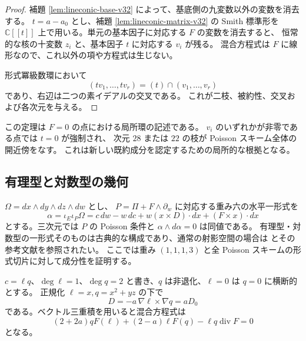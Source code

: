 \begin{proof}
補題 \ref{lem:lineconic-base-v32} によって、基底側の九変数以外の変数を消去する。
$t=a-a_0$ とし、補題 \ref{lem:lineconic-matrix-v32} の Smith 標準形を
$\mathbb C[[t]]$ 上で用いる。単元の基本因子に対応する $F$ の変数を消去すると、
恒常的な核の十変数 $z_i$ と、基本因子 $t$ に対応する $v_i$ が残る。
混合方程式は $F$ に線形なので、これ以外の項や方程式は生じない。

形式冪級数環において
\[
 (tv_1,\ldots,tv_r)=(t)\cap(v_1,\ldots,v_r)
\]
であり、右辺は二つの素イデアルの交叉である。
これが二枝、被約性、交叉および各次元を与える。
\end{proof}

この定理は $F=0$ の点における局所環の記述である。
$v_i$ のいずれかが非零である点では $t=0$ が強制され、
次元 $28$ または $22$ の枝が Poisson スキーム全体の開近傍をなす。
これは新しい既約成分を認定するための局所的な根拠となる。

\subsection{有理型と対数型の幾何}

$\Omega=dx\wedge dy\wedge dz\wedge dw$ とし、
$P=\Pi+F\wedge\partial_w$ に対応する重み六の水平一形式を
\[
 \alpha=\iota_E\iota_P\Omega
 =c\,dw-w\,dc+w(x\times D)\cdot dx+(F\times x)\cdot dx
\]
とする。三次元では $P$ の Poisson 条件と $\alpha\wedge d\alpha=0$ は同値である。
有理型・対数型の一形式そのものは古典的な構成であり、通常の射影空間の場合は
\cite{Molinuevo2016} とその参考文献を参照されたい。
ここでは重み $(1,1,1,3)$ と全 Poisson スキームの形式切片に対して成分性を証明する。

$c=\ell q$、$\deg\ell=1$、$\deg q=2$ と書き、$q$ は非退化、$\ell=0$ は $q=0$ に横断的とする。
正規化 $\ell=x,q=x^2+yz$ の下で
\[
 D=-a\,\nabla\ell\times\nabla q=aD_0
\]
である。ベクトル三重積を用いると混合方程式は
\begin{equation}
 (2+2a)qF(\ell)+(2-a)\ell F(q)-\ell q\operatorname{div}F=0
 \label{eq:lineconic-factorized-v32}
\end{equation}
となる。

